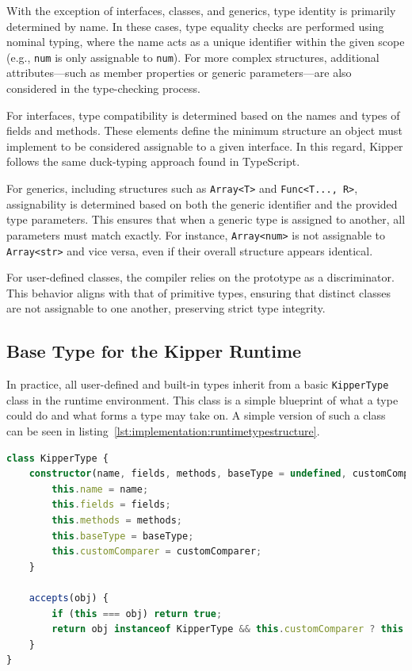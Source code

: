 With the exception of interfaces, classes, and generics, type identity is primarily determined by name. In these cases, type equality checks are performed using nominal typing, where the name acts as a unique identifier within the given scope (e.g., \lstinline|num| is only assignable to \lstinline|num|). For more complex structures, additional attributes—such as member properties or generic parameters—are also considered in the type-checking process.

For interfaces, type compatibility is determined based on the names and types of fields and methods. These elements define the minimum structure an object must implement to be considered assignable to a given interface. In this regard, Kipper follows the same duck-typing approach found in TypeScript.

For generics, including structures such as \lstinline|Array<T>| and \lstinline|Func<T..., R>|, assignability is determined based on both the generic identifier and the provided type parameters. This ensures that when a generic type is assigned to another, all parameters must match exactly. For instance, \lstinline|Array<num>| is not assignable to \lstinline|Array<str>| and vice versa, even if their overall structure appears identical.

For user-defined classes, the compiler relies on the prototype as a discriminator. This behavior aligns with that of primitive types, ensuring that distinct classes are not assignable to one another, preserving strict type integrity.

\subsection{Base Type for the Kipper Runtime}
\label{sec:basetype}

In practice, all user-defined and built-in types inherit from a basic \lstinline|KipperType| class in the runtime environment. This class is a simple blueprint of what a type could do and what forms a type may take on. A simple version of such a class can be seen in listing~\ref{lst:implementation:runtimetypestructure}.

\begin{lstlisting}[language=TypeScript,caption=The structure of a runtime type,label=lst:implementation:runtimetypestructure]
class KipperType {
	constructor(name, fields, methods, baseType = undefined, customComparer = undefined) {
		this.name = name;
		this.fields = fields;
		this.methods = methods;
		this.baseType = baseType;
		this.customComparer = customComparer;
	}

	accepts(obj) {
		if (this === obj) return true;
		return obj instanceof KipperType && this.customComparer ? this.customComparer(this, obj) : false;
	}
}
\end{lstlisting}

